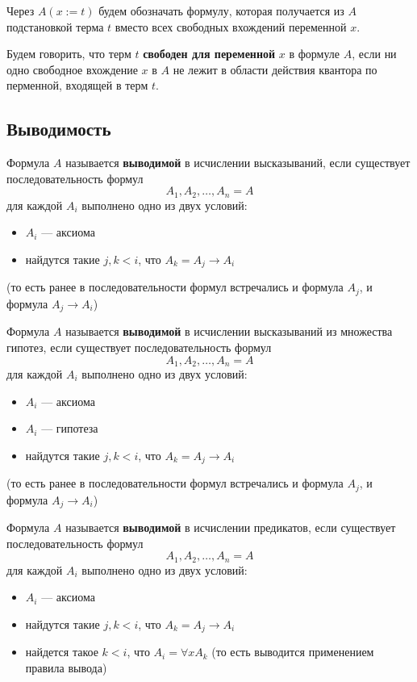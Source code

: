 \documentclass[11pt]{article}
\begin{document}
\begin{remark}
    Через $A(x := t)$ будем обозначать формулу, которая получается из $A$ подстановкой
    терма $t$ вместо всех свободных вхождений переменной $x$.
\end{remark}

\begin{definition}
    Будем говорить, что терм $t$ \textbf{свободен для переменной} $x$ в формуле $A$, 
    если ни одно свободное вхождение $x$ в $A$ не лежит в области действия квантора по 
    перменной, входящей в терм $t$.
\end{definition}

\subsection{Выводимость}

\begin{definition}
    Формула $A$ называется \textbf{выводимой} в исчислении высказываний, если существует
    последовательность формул \[A_1, A_2, \dots, A_n = A\]
    для каждой $A_i$ выполнено одно из двух условий:
    \begin{itemize}
        \item $A_i$ --- аксиома
        \item найдутся такие $j, k < i$, что $A_k = A_j \to A_i$ 
    \end{itemize}
    (то есть ранее в последовательности формул встречались и формула $A_j$, и формула 
    $A_j \to A_i$)
\end{definition}

\begin{definition}
    Формула $A$ называется \textbf{выводимой} в исчислении высказываний из множества гипотез, 
    если существует последовательность формул \[A_1, A_2, \dots, A_n = A\]
    для каждой $A_i$ выполнено одно из двух условий:
    \begin{itemize}
        \item $A_i$ --- аксиома
        \item $A_i$ --- гипотеза
        \item найдутся такие $j, k < i$, что $A_k = A_j \to A_i$ 
    \end{itemize}
    (то есть ранее в последовательности формул встречались и формула $A_j$, и формула 
    $A_j \to A_i$)
\end{definition}

\begin{definition}
    Формула $A$ называется \textbf{выводимой} в исчислении предикатов, если существует
    последовательность формул \[A_1, A_2, \dots, A_n = A\]
    для каждой $A_i$ выполнено одно из двух условий:
    \begin{itemize}
        \item $A_i$ --- аксиома
        \item найдутся такие $j, k < i$, что $A_k = A_j \to A_i$ 
        \item найдется такое $k < i$, что $A_i = \forall x A_k$ (то есть выводится
        применением правила вывода)
    \end{itemize}
\end{definition}
\end{document}
